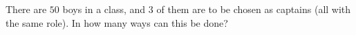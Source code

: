 There are $50$ boys in a class, and $3$ of them are to be chosen as captains (all with the same role). In how many ways can this be done?
